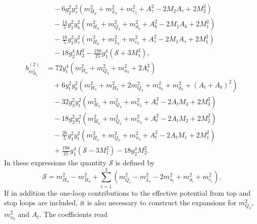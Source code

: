 \documentclass[preprint,amsmath,amssymb,aps,superscriptaddress,prd,
showpacs,floatfix,nofootinbib]{revtex4-1}
\begin{document}
\begin{subequations}
\begin{align}
& \quad {} - 6 g_2^2 y_\tau^2 \left ( m_{H_d}^2 + m_{L_3}^2 + m_{e_3}^2 +
A_\tau^2 - 2 M_2 A_\tau + 2 M_2^2 \right ) \nonumber \\
& \quad {} - \frac{14}{5} g_1^2 y_b^2 \left ( m_{H_d}^2 + m_{Q_3}^2 +
m_{d_3}^2 + A_b^2 - 2 M_1 A_b + 2 M_1^2 \right ) \nonumber \\
& \quad {} - \frac{18}{5} g_1^2 y_\tau^2 \left ( m_{H_d}^2 + m_{L_3}^2 +
m_{e_3}^2 + A_\tau^2 - 2 M_1 A_\tau + 2 M_1^2 \right ) \nonumber \\
& \quad {} - 18 g_2^4 M_2^2 - \frac{198}{25} g_1^4 \left ( \mathcal{S} +
3 M_1^2 \right ) , \label{eq:MSSMmHd2b2} \\
b_{m_{H_u}^2}^{(2)} &= 72 y_t^4 \left ( m_{H_u}^2 + m_{Q_3}^2 + m_{u_3}^2 +
2 A_t^2 \right ) \nonumber \\
& \quad {} + 6 y_t^2 y_b^2 \left ( m_{H_u}^2 + m_{H_d}^2 + 2 m_{Q_3}^2 +
m_{u_3}^2 + m_{d_3}^2 + ( A_t + A_b )^2 \right ) \nonumber \\
& \quad {} - 32 g_3^2 y_t^2 \left ( m_{H_u}^2 + m_{Q_3}^2 + m_{u_3}^2 + A_t^2
- 2 A_t M_3 + 2 M_3^2 \right ) \nonumber \\
& \quad{} - 18 g_2^2 y_t^2 \left ( m_{H_u}^2 + m_{Q_3}^2 + m_{u_3}^2 + A_t^2
- 2 A_t M_2 + 2 M_2^2 \right ) \nonumber \\
& \quad {} - \frac{26}{5} g_1^2 y_t^2 \left ( m_{H_u}^2 + m_{Q_3}^2 +
m_{u_3}^2 + A_t^2 - 2 A_t M_1 + 2 M_1^2 \right ) \nonumber \\
& \quad {} + \frac{198}{25} g_1^4 \left ( \mathcal{S} - 3 M_1^2 \right )
- 18 g_2^4 M_2^2 . \label{eq:MSSMmHu2b2}
\end{align}
\end{subequations}
In these expressions the quantity $\mathcal{S}$ is defined by
\begin{equation} \label{eq:MSSMgaugeBetaContribution}
\mathcal{S} = m_{H_u}^2 - m_{H_d}^2 + \sum_{i=1}^3 \left ( m_{Q_i}^2 -
m_{L_i}^2 - 2 m_{u_i}^2 + m_{d_i}^2 + m_{e_i}^2 \right ) .
\end{equation}
If in addition the one-loop contributions to the effective potential
from top and stop loops are included, it is also necessary to
construct the expansions for $m_{Q_3}^2$, $m_{u_3}^2$ and $A_t$. The
coefficients read
\end{document}
